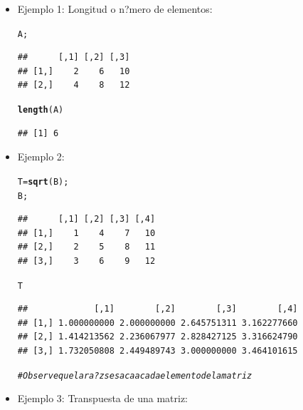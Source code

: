 \documentclass[12pt,letterpaper]{article}\usepackage[]{graphicx}\usepackage[]{color}
\makeatletter
\newcommand{\hlcom}[1]{\textcolor[rgb]{0.678,0.584,0.686}{\textit{#1}}}%
\newcommand{\hlstd}[1]{\textcolor[rgb]{0.345,0.345,0.345}{#1}}%
\newcommand{\hlkwb}[1]{\textcolor[rgb]{0.69,0.353,0.396}{#1}}%
\newcommand{\hlkwd}[1]{\textcolor[rgb]{0.737,0.353,0.396}{\textbf{#1}}}%
\newenvironment{kframe}{%
 \def\at@end@of@kframe{}%
 \ifinner\ifhmode%
  \def\at@end@of@kframe{\end{minipage}}%
  \begin{minipage}{\columnwidth}%
 \fi\fi%
 \def\FrameCommand##1{\hskip\@totalleftmargin \hskip-\fboxsep
 \colorbox{shadecolor}{##1}\hskip-\fboxsep
     \hskip-\linewidth \hskip-\@totalleftmargin \hskip\columnwidth}%
 \MakeFramed {\advance\hsize-\width
   \@totalleftmargin\z@ \linewidth\hsize
   \@setminipage}}%
 {\par\unskip\endMakeFramed%
 \at@end@of@kframe}
\newenvironment{knitrout}{}{} %
\makeatother
\begin{document}
\begin{itemize}
\item Ejemplo 1: Longitud o n?mero de elementos:
\begin{knitrout}
\color{fgcolor}\begin{kframe}
\begin{alltt}
\hlstd{A;}
\end{alltt}
\begin{verbatim}
##      [,1] [,2] [,3]
## [1,]    2    6   10
## [2,]    4    8   12
\end{verbatim}
\begin{alltt}
\hlkwd{length}\hlstd{(A)}
\end{alltt}
\begin{verbatim}
## [1] 6
\end{verbatim}
\end{kframe}
\end{knitrout}
\item Ejemplo 2:
\begin{knitrout}
\color{fgcolor}\begin{kframe}
\begin{alltt}
\hlstd{T}\hlkwb{=}\hlkwd{sqrt}\hlstd{(B);}
\hlstd{B;}
\end{alltt}
\begin{verbatim}
##      [,1] [,2] [,3] [,4]
## [1,]    1    4    7   10
## [2,]    2    5    8   11
## [3,]    3    6    9   12
\end{verbatim}
\begin{alltt}
\hlstd{T}
\end{alltt}
\begin{verbatim}
##             [,1]        [,2]        [,3]        [,4]
## [1,] 1.000000000 2.000000000 2.645751311 3.162277660
## [2,] 1.414213562 2.236067977 2.828427125 3.316624790
## [3,] 1.732050808 2.449489743 3.000000000 3.464101615
\end{verbatim}
\begin{alltt}
\hlcom{# Observe que la ra?z se saca a cada elemento de la matriz}
\end{alltt}
\end{kframe}
\end{knitrout}
\item Ejemplo 3: Transpuesta de una matriz:
\begin{knitrout}
\color{fgcolor}\begin{kframe}
\begin{alltt}

\end{alltt}
\end{kframe}
\end{knitrout}
\end{itemize}
\end{document}
